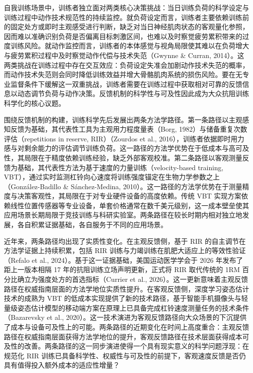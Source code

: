 \documentclass[UTF8,zihao=-4,twoside,openany]{ctexbook}
\begin{document}
自我训练场景中，训练者独立面对两类核心决策挑战：当日训练负荷的科学设定与训练过程中动作技术规范性的持续监控。就负荷设定而言，训练者主要依赖训练前的固定处方或即时主观感受进行判断，缺乏对当日神经肌肉状态的客观量化参照，因而难以准确识别负荷是否偏离目标刺激区间，也难以及时察觉疲劳累积带来的过度训练风险。就动作监控而言，训练者的本体感觉与视角局限使其难以在负荷增大与疲劳累积过程中及时察觉动作代偿与技术失范（Gwynne \& Curran, 2014）。这两类挑战在训练过程中存在交互效应：负荷设定失准会加剧动作技术失范的概率，而动作技术失范则会同时降低训练效益并增大骨骼肌肉系统的损伤风险。要在无专业监督条件下缓解这一双重挑战，训练者需要在训练过程中获取相对可靠的反馈信息以动态调节负荷与动作决策。反馈机制的科学性与可及性因此成为大众抗阻训练科学化的核心议题。

围绕反馈机制的构建，训练科学先后发展出两条方法学路径。第一条路径以主观感知反馈为基础，其代表性工具为主观用力程度量表（Borg, 1982）与储备重复次数评估（repetitions in reserve, RIR）（Zourdos et al., 2016），训练者依据即时用力感与对剩余能力的评估调节训练负荷。这一路径的方法学优势在于低成本与高可及性，其局限在于精度依赖训练经验，缺乏外部客观校准。第二条路径以客观测量反馈为基础，其代表性方法为基于速度的力量训练（velocity-based training, VBT），通过实时监测杠铃向心速度将训练强度锚定在生物力学参数之上（González-Badillo \& Sánchez-Medina, 2010）。这一路径的方法学优势在于测量精度与决策客观性，其局限在于对专业硬件设备的高度依赖。传统 VBT 实现方案依赖线性位置传感器等专业设备，单套价格通常在数千美元级别，这一成本壁垒使其应用场景长期局限于竞技训练与科研实验室。两条路径在较长时期内相对独立地发展，各自积累证据基础，各自服务于不同的应用场景。

近年来，两条路径均出现了实质性变化。在主观反馈侧，基于 RIR 的自主调节在方法学证据上持续积累，包括 RIR 训练与力竭训练在肌肥大适应上的等效性验证（Refalo et al., 2024）。基于这一证据基础，美国运动医学学会于 2026 年发布了距上一版本相隔 17 年的抗阻训练立场声明更新，正式将 RIR 取代传统的 1RM 百分比确立为强度处方的首选指标（Currier et al., 2026）。这一更新意味着主观反馈路径在权威指南层面的方法学地位实质性提升。在客观反馈侧，深度学习姿态估计技术的成熟为 VBT 的低成本实现提供了新的技术路径，基于智能手机摄像头与轻量级姿态估计模型的移动端方案在原理上已具备完成杠铃速度测量任务的技术条件（Bazarevsky et al., 2020）。这一技术演进为客观反馈路径向大众场景的下沉提供了成本与设备可及性上的可能。两条路径的近期变化在时间上高度重合：主观反馈路径在权威指南层面获得方法学地位的提升，客观反馈路径在技术层面获得成本可及性的改善。两条路径的这一同步演进使得一个具有现实意义的科学问题浮现：在规范化 RIR 训练已具备科学性、权威性与可及性的前提下，客观速度反馈是否仍具有值得投入额外成本的适应性增量？
\end{document}
